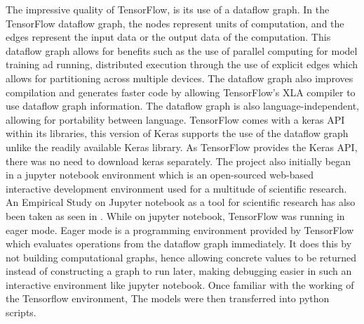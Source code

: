 The impressive quality of TensorFlow, is its use of a dataflow graph. In the TensorFlow dataflow graph, the nodes represent units of computation, and the edges represent the input data or the output data of the computation. This dataflow graph allows for benefits such as the use of parallel computing for model training ad running, distributed execution through the use of explicit edges which allows for partitioning across multiple devices. The dataflow graph also improves compilation and generates faster code by allowing TensorFlow's XLA compiler to use dataflow graph information. The dataflow graph is also language-independent, allowing for portability between language.
TensorFlow comes with a keras API within its libraries, this version of Keras supports the use of the dataflow graph unlike the readily available Keras library.  As TensorFlow provides the Keras API,  there was no need to download keras separately.
The project also initially began in a jupyter notebook environment which is an open-sourced web-based interactive development environment used for a multitude of scientific research. An Empirical Study on Jupyter notebook as a tool for scientific research has also been taken as seen in \citep{Randles_2017}. While on jupyter notebook, TensorFlow was running in eager mode.  Eager mode is a programming environment provided by TensorFlow which evaluates operations from the dataflow graph immediately. It does this by not building computational graphs, hence allowing concrete values to be returned instead of constructing a graph to run later, making debugging easier in such an interactive environment like jupyter notebook.
Once familiar with the working of the Tensorflow environment, The models were then transferred into python scripts.


